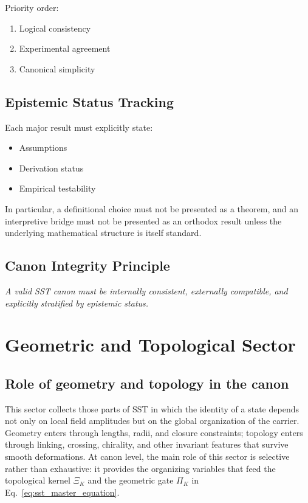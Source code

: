 \documentclass[11pt]{article}
\theoremstyle{definition}
\theoremstyle{plain}
\theoremstyle{remark}
\begin{document}
        Priority order:
        
        \begin{enumerate}
            \item Logical consistency
            \item Experimental agreement
            \item Canonical simplicity
        \end{enumerate}
    
    \subsection{Epistemic Status Tracking}
        
        Each major result must explicitly state:
        
        \begin{itemize}
            \item Assumptions
            \item Derivation status
            \item Empirical testability
        \end{itemize}

        In particular, a definitional choice must not be presented as a theorem, and an interpretive bridge must not be presented as an orthodox result unless the underlying mathematical structure is itself standard.
    
    \subsection{Canon Integrity Principle}
        
        \begin{center}
            \textit{A valid SST canon must be internally consistent, externally compatible, and explicitly stratified by epistemic status.}
        \end{center}

    \section{Geometric and Topological Sector}
        \label{sec:geometry}

    \subsection{Role of geometry and topology in the canon}
        This sector collects those parts of SST in which the identity of a state depends not only on local field amplitudes but on the global organization of the carrier. Geometry enters through lengths, radii, and closure constraints; topology enters through linking, crossing, chirality, and other invariant features that survive smooth deformations. At canon level, the main role of this sector is selective rather than exhaustive: it provides the organizing variables that feed the topological kernel $\Xi_K$ and the geometric gate $\Pi_K$ in Eq.~\eqref{eq:sst_master_equation}.
\end{document}
